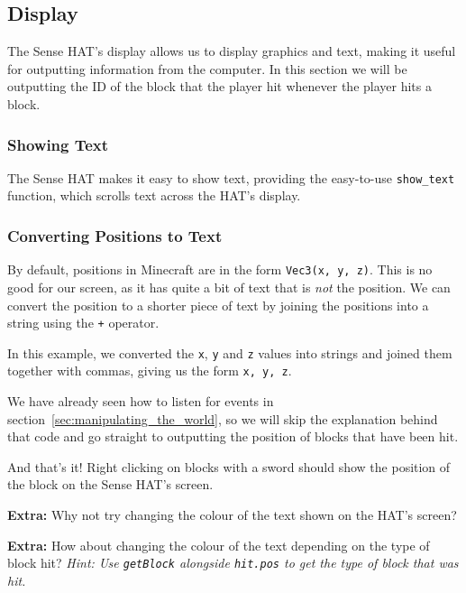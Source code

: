 	\subsection{Display}

		The Sense HAT's display allows us to display graphics and text, making it useful for outputting information from the computer. In this section we will be outputting the ID of the block that the player hit whenever the player hits a block.

			\subsubsection{Showing Text}

				The Sense HAT makes it easy to show text, providing the easy-to-use \texttt{show\_text} function, which scrolls text across the HAT's display.

				

			\subsubsection{Converting Positions to Text}

				By default, positions in Minecraft are in the form \texttt{Vec3(x, y, z)}. This is no good for our screen, as it has quite a bit of text that is \textit{not} the position. We can convert the position to a shorter piece of text by joining the positions into a string using the \texttt{+} operator.

				

				In this example, we converted the \texttt{x}, \texttt{y} and \texttt{z} values into strings and joined them together with commas, giving us the form \texttt{x, y, z}.

				We have already seen how to listen for events in section~\ref{sec:manipulating_the_world}, so we will skip the explanation behind that code and go straight to outputting the position of blocks that have been hit.

				

				And that's it! Right clicking on blocks with a sword should show the position of the block on the Sense HAT's screen.

				\textbf{Extra:} Why not try changing the colour of the text shown on the HAT's screen?

				\textbf{Extra:} How about changing the colour of the text depending on the type of block hit? \textit{Hint: Use \texttt{getBlock} alongside \texttt{hit.pos} to get the type of block that was hit.}
